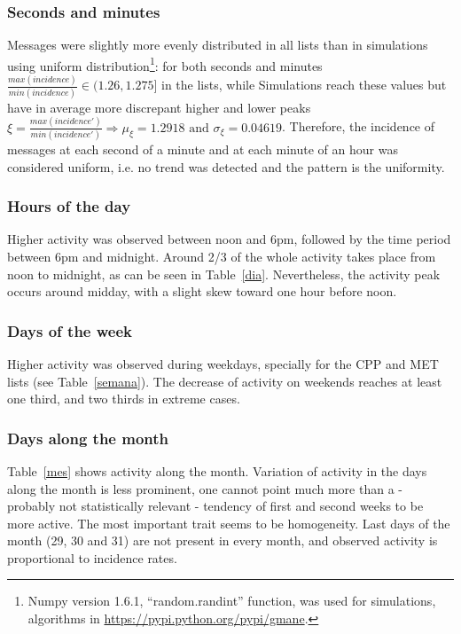 \documentclass[%
 aip,
 jmp,%
 amsmath,amssymb,
 reprint,%
]{revtex4-1}
\begin{document}
\subsubsection{Seconds and minutes}
Messages were slightly more evenly distributed in all lists than in simulations using uniform distribution\footnote{Numpy version 1.6.1, ``random.randint'' function, was used for simulations, algorithms in \url{https://pypi.python.org/pypi/gmane}.}: for both seconds and minutes $\frac{max(incidence)}{min(incidence)} \in (1.26,1.275]$ in the lists, while Simulations reach these values but have in average more discrepant higher and lower peaks $\xi=\frac{max(incidence')}{min(incidence')} \Rightarrow \mu_\xi=1.2918 \text{ and } \sigma_\xi=0.04619$.
Therefore, the incidence of messages at each second of a minute and at each minute of an hour was considered uniform, i.e. no trend was detected and the pattern is the uniformity.

\subsubsection{Hours of the day}
Higher activity was observed between noon and 6pm, followed by the time period between 6pm and midnight. Around 2/3 of the whole activity takes place from noon to midnight, as can be seen in Table~\ref{dia}. Nevertheless, the activity peak occurs around midday, with a slight skew toward one hour before noon.

\subsubsection{Days of the week}
Higher activity was observed during weekdays, specially for the CPP and MET lists (see Table~\ref{semana}). The decrease of activity on weekends reaches at least one third, and two thirds in extreme cases.

\subsubsection{Days along the month}
Table~\ref{mes} shows activity along the month. Variation of activity in the days along the month is less prominent, one cannot point much more than a - probably not statistically relevant - tendency of first and second weeks to be more active. The most important trait seems to be homogeneity. Last days of the month (29, 30 and 31) are not present in every month, and observed activity is proportional to incidence rates.
\end{document}
